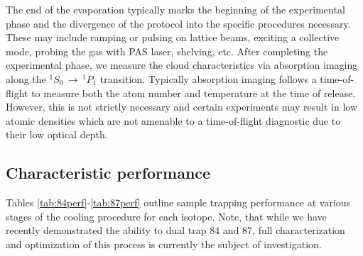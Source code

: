 The end of the evaporation typically marks the beginning of the experimental phase and the divergence of the protocol into the specific procedures necessary. 
These may include ramping or pulsing on lattice beams, exciting a collective mode, probing the gas with PAS laser, shelving, etc. 
After completing the experimental phase, we measure the cloud characteristics via absorption imaging along the $^1S_0\,\rightarrow\,^1P_1$ transition. 
Typically absorption imaging follows a time-of-flight to measure both the atom number and temperature at the time of release. 
However, this is not strictly necessary and certain experiments may result in low atomic densities which are not amenable to a time-of-flight diagnostic due to their low optical depth.

\subsection{Characteristic performance} \label{sec:benchmark_trapping}
Tables \ref{tab:84perf}-\ref{tab:87perf} outline sample trapping performance at various stages of the cooling procedure for each isotope.
Note, that while we have recently demonstrated the ability to dual trap 84 and 87, full characterization and optimization of this process is currently the subject of investigation.

